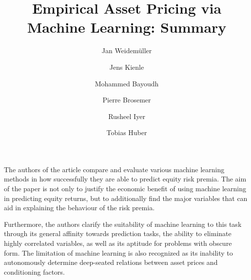 \documentclass{article}
\date{\displaydate{date}}
\title{Empirical Asset Pricing via Machine Learning: Summary}
\author{Jan Weidemüller \and Jens Kienle \and Mohammed Bayoudh \and Pierre Brosemer \and Rusheel Iyer \and Tobias Huber}
\begin{document}
	
	\maketitle
	\pagebreak
	
	The authors of the article compare and evaluate various machine learning methods in how successfully they are able to predict equity risk premia. The aim of the paper is not only to justify the economic benefit of using machine learning in predicting equity returns, but to additionally find the major variables that can aid in explaining the behaviour of the risk premia.
	
	Furthermore, the authors clarify the suitability of machine learning to this task through its general affinity towards prediction tasks, the ability to eliminate highly correlated variables, as well as its aptitude for problems with obscure form. The limitation of machine learning is also recognized as its inability to autonomously determine deep-seated relations between asset prices and conditioning factors.
\end{document}
